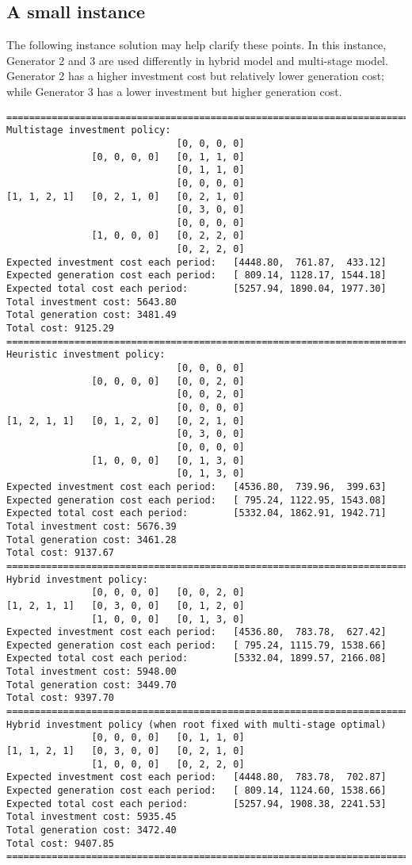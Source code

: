 \documentclass[10pt]{article}
\theoremstyle{plain}
\theoremstyle{definition}
\theoremstyle{remark}
\begin{document}
\subsection*{A small instance}
The following instance solution may help clarify these points.
In this instance, Generator 2 and 3 are used differently in hybrid model and multi-stage model.
Generator 2 has a higher investment cost but relatively lower generation cost;
while Generator 3 has a lower investment but higher generation cost.
{\scriptsize
\begin{verbatim}
========================================================================
Multistage investment policy:
                              [0, 0, 0, 0]
               [0, 0, 0, 0]   [0, 1, 1, 0]
                              [0, 1, 1, 0]
                              [0, 0, 0, 0]
[1, 1, 2, 1]   [0, 2, 1, 0]   [0, 2, 1, 0]
                              [0, 3, 0, 0]
                              [0, 0, 0, 0]
               [1, 0, 0, 0]   [0, 2, 2, 0]
                              [0, 2, 2, 0]
Expected investment cost each period:   [4448.80,  761.87,  433.12]
Expected generation cost each period:   [ 809.14, 1128.17, 1544.18]
Expected total cost each period:        [5257.94, 1890.04, 1977.30]
Total investment cost: 5643.80
Total generation cost: 3481.49
Total cost: 9125.29
========================================================================
Heuristic investment policy:
                              [0, 0, 0, 0]
               [0, 0, 0, 0]   [0, 0, 2, 0]
                              [0, 0, 2, 0]
                              [0, 0, 0, 0]
[1, 2, 1, 1]   [0, 1, 2, 0]   [0, 2, 1, 0]
                              [0, 3, 0, 0]
                              [0, 0, 0, 0]
               [1, 0, 0, 0]   [0, 1, 3, 0]
                              [0, 1, 3, 0]
Expected investment cost each period:   [4536.80,  739.96,  399.63]
Expected generation cost each period:   [ 795.24, 1122.95, 1543.08]
Expected total cost each period:        [5332.04, 1862.91, 1942.71]
Total investment cost: 5676.39
Total generation cost: 3461.28
Total cost: 9137.67
========================================================================
Hybrid investment policy:
               [0, 0, 0, 0]   [0, 0, 2, 0]
[1, 2, 1, 1]   [0, 3, 0, 0]   [0, 1, 2, 0]
               [1, 0, 0, 0]   [0, 1, 3, 0]
Expected investment cost each period:   [4536.80,  783.78,  627.42]
Expected generation cost each period:   [ 795.24, 1115.79, 1538.66]
Expected total cost each period:        [5332.04, 1899.57, 2166.08]
Total investment cost: 5948.00
Total generation cost: 3449.70
Total cost: 9397.70
========================================================================
Hybrid investment policy (when root fixed with multi-stage optimal)
               [0, 0, 0, 0]   [0, 1, 1, 0]
[1, 1, 2, 1]   [0, 3, 0, 0]   [0, 2, 1, 0]
               [1, 0, 0, 0]   [0, 2, 2, 0]
Expected investment cost each period:   [4448.80,  783.78,  702.87]
Expected generation cost each period:   [ 809.14, 1124.60, 1538.66]
Expected total cost each period:        [5257.94, 1908.38, 2241.53]
Total investment cost: 5935.45
Total generation cost: 3472.40
Total cost: 9407.85
========================================================================


\end{verbatim}}
\end{document}
